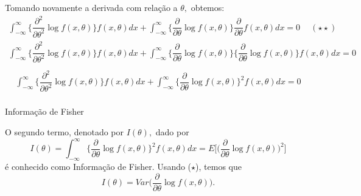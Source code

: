 \documentclass[12pt]{beamer}
\begin{document}
\begin{frame}{}
\begin{block}{}
\justifying
Tomando novamente a derivada com relação a $\theta,$ obtemos:
{\footnotesize
\begin{align*}
    \int_{-\infty}^{\infty}\Big\{\dfrac{\partial^{2}}{\partial\theta^{2}}\log{f(x,\theta)}\Big\}f(x,\theta)dx+\int_{-\infty}^{\infty}\Big\{\dfrac{\partial}{\partial\theta}\log{f(x,\theta)}\Big\}\dfrac{\partial}{\partial\theta}f(x,\theta)dx=0~\quad (\star\star)
\end{align*}}
\pause
{\footnotesize
\begin{align*}
\int_{-\infty}^{\infty}\Big\{\dfrac{\partial^{2}}{\partial\theta^{2}}\log{f(x,\theta)}\Big\}f(x,\theta)dx+\int_{-\infty}^{\infty}\Big\{\dfrac{\partial}{\partial\theta}\log{f(x,\theta)}\Big\}\Big\{\dfrac{\partial}{\partial\theta}\log{f(x,\theta)}\Big\}f(x,\theta)dx=0\\
\end{align*}}
\pause 
{\small
\begin{align*}
\int_{-\infty}^{\infty}\Big\{\dfrac{\partial^{2}}{\partial\theta^{2}}\log{f(x,\theta)}\Big\}f(x,\theta)dx+\int_{-\infty}^{\infty}\Big\{\dfrac{\partial}{\partial\theta}\log{f(x,\theta)}\Big\}^{2}f(x,\theta)dx=0\\
\end{align*}}
\end{block}
\end{frame}

\begin{frame}{Informação de Fisher}
\begin{block}{}
\justifying
O segundo termo, denotado por $I(\theta),$ dado por $$I(\theta)=\int_{-\infty}^{\infty}\Big\{\dfrac{\partial}{\partial\theta}\log{f(x,\theta)}\Big\}^{2}f(x,\theta)dx=E\Big[\Big(\dfrac{\partial}{\partial\theta}\log{f(x,\theta)}\Big)^{2}\Big]$$ é conhecido como Informação de Fisher. Usando ($\star$), temos que
$$I(\theta)=Var\Big(\dfrac{\partial}{\partial\theta}\log{f(x,\theta)}\Big).$$
\end{block}
\end{frame}
\end{document}
